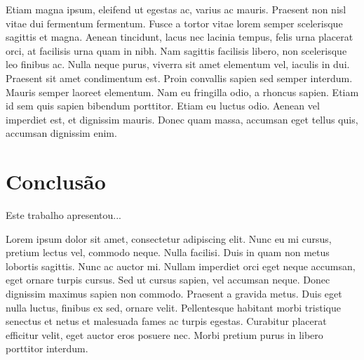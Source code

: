 \documentclass[a4paper]{sbgames}
\begin{document}
Etiam magna ipsum, eleifend ut egestas ac, varius ac mauris. Praesent non nisl vitae dui fermentum fermentum. Fusce a tortor vitae lorem semper scelerisque sagittis et magna. Aenean tincidunt, lacus nec lacinia tempus, felis urna placerat orci, at facilisis urna quam in nibh. Nam sagittis facilisis libero, non scelerisque leo finibus ac. Nulla neque purus, viverra sit amet elementum vel, iaculis in dui. Praesent sit amet condimentum est. Proin convallis sapien sed semper interdum. Mauris semper laoreet elementum. Nam eu fringilla odio, a rhoncus sapien. Etiam id sem quis sapien bibendum porttitor. Etiam eu luctus odio. Aenean vel imperdiet est, et dignissim mauris. Donec quam massa, accumsan eget tellus quis, accumsan dignissim enim. 

\section{Conclusão}
\label{sec:Conclusao}
Este trabalho apresentou...

Lorem ipsum dolor sit amet, consectetur adipiscing elit. Nunc eu mi cursus, pretium lectus vel, commodo neque. Nulla facilisi. Duis in quam non metus lobortis sagittis. Nunc ac auctor mi. Nullam imperdiet orci eget neque accumsan, eget ornare turpis cursus. Sed ut cursus sapien, vel accumsan neque. Donec dignissim maximus sapien non commodo. Praesent a gravida metus. Duis eget nulla luctus, finibus ex sed, ornare velit. Pellentesque habitant morbi tristique senectus et netus et malesuada fames ac turpis egestas. Curabitur placerat efficitur velit, eget auctor eros posuere nec. Morbi pretium purus in libero porttitor interdum.


%


\end{document}
